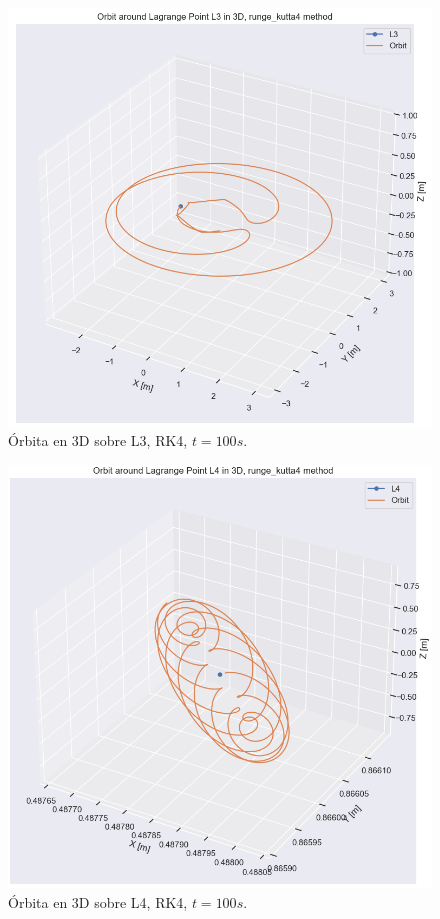 \documentclass[12pt,a4paper]{article}
\begin{document}
\begin{figure}[H]
	\centering
	\includegraphics[width=\x\textwidth]{FIGURES/mil6/L3_orbit_rk4_t100.png}
	\caption{Órbita en 3D sobre L3, RK4, $t = 100 s$.}
	\label{L3_orbit_rk4_t100}
\end{figure}
\begin{figure}[H]
	\centering
	\includegraphics[width=\x\textwidth]{FIGURES/mil6/L4_orbit_rk4_t100.png}
	\caption{Órbita en 3D sobre L4, RK4, $t = 100 s$.}
	\label{L4_orbit_rk4_t100}
\end{figure}
\end{document}
